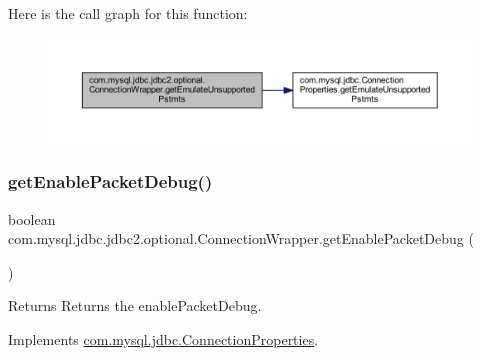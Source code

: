 Here is the call graph for this function\+:
\nopagebreak
\begin{figure}[H]
\begin{center}
\leavevmode
\includegraphics[width=350pt]{classcom_1_1mysql_1_1jdbc_1_1jdbc2_1_1optional_1_1_connection_wrapper_a778c594d3f6f04b555615834c7287ac3_cgraph}
\end{center}
\end{figure}
\mbox{\label{classcom_1_1mysql_1_1jdbc_1_1jdbc2_1_1optional_1_1_connection_wrapper_a461ba0551d56c29d54b68ea0f12a875d}} 
\subsubsection{\texorpdfstring{get\+Enable\+Packet\+Debug()}{getEnablePacketDebug()}}
{\footnotesize\ttfamily boolean com.\+mysql.\+jdbc.\+jdbc2.\+optional.\+Connection\+Wrapper.\+get\+Enable\+Packet\+Debug (\begin{DoxyParamCaption}{ }\end{DoxyParamCaption})}

\begin{DoxyReturn}{Returns}
Returns the enable\+Packet\+Debug. 
\end{DoxyReturn}


Implements \mbox{\hyperlink{interfacecom_1_1mysql_1_1jdbc_1_1_connection_properties_accdc773d99a84b7b1db522aa324d6084}{com.\+mysql.\+jdbc.\+Connection\+Properties}}.

